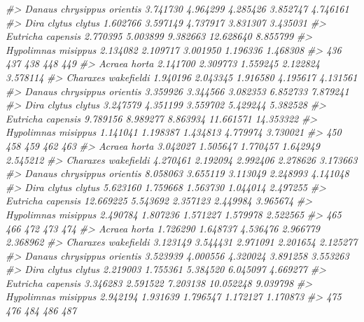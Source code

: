 \documentclass[
]{article}
\newenvironment{Shaded}{\begin{snugshade}}{\end{snugshade}}
\newcommand{\CommentTok}[1]{\textcolor[rgb]{0.56,0.35,0.01}{\textit{#1}}}
\begin{document}
\begin{Shaded}
\begin{Highlighting}[]
\CommentTok{\#\textgreater{} Danaus chrysippus orientis 3.741730 4.964299 4.285426  3.852747 4.746161}
\CommentTok{\#\textgreater{} Dira clytus clytus         1.602766 3.597149 4.737917  3.831307 3.435031}
\CommentTok{\#\textgreater{} Eutricha capensis          2.770395 5.003899 9.382663 12.628640 8.855799}
\CommentTok{\#\textgreater{} Hypolimnas misippus        2.134082 2.109717 3.001950  1.196336 1.468308}
\CommentTok{\#\textgreater{}                                 436      437      438       448       449}
\CommentTok{\#\textgreater{} Acraea horta               2.141700 2.309773 1.559245  2.122824  3.578114}
\CommentTok{\#\textgreater{} Charaxes wakefieldi        1.940196 2.043345 1.916580  4.195617  4.131561}
\CommentTok{\#\textgreater{} Danaus chrysippus orientis 3.359926 3.344566 3.082353  6.852733  7.879241}
\CommentTok{\#\textgreater{} Dira clytus clytus         3.247579 4.351199 3.559702  5.429244  5.382528}
\CommentTok{\#\textgreater{} Eutricha capensis          9.789156 8.989277 8.863934 11.661571 14.353322}
\CommentTok{\#\textgreater{} Hypolimnas misippus        1.141041 1.198387 1.434813  4.779974  3.730021}
\CommentTok{\#\textgreater{}                                  450      458      459      462      463}
\CommentTok{\#\textgreater{} Acraea horta                3.042027 1.505647 1.770457 1.642949 2.545212}
\CommentTok{\#\textgreater{} Charaxes wakefieldi         4.270461 2.192094 2.992406 2.278626 3.173663}
\CommentTok{\#\textgreater{} Danaus chrysippus orientis  8.058063 3.655119 3.113049 2.248993 4.141048}
\CommentTok{\#\textgreater{} Dira clytus clytus          5.623160 1.759668 1.563730 1.044014 2.497255}
\CommentTok{\#\textgreater{} Eutricha capensis          12.669225 5.543692 2.357123 2.449984 3.965674}
\CommentTok{\#\textgreater{} Hypolimnas misippus         2.490784 1.807236 1.571227 1.579978 2.522565}
\CommentTok{\#\textgreater{}                                 465      466      472       473      474}
\CommentTok{\#\textgreater{} Acraea horta               1.726290 1.648737 4.536476  2.966779 2.368962}
\CommentTok{\#\textgreater{} Charaxes wakefieldi        3.123149 3.544431 2.971091  2.201654 2.125277}
\CommentTok{\#\textgreater{} Danaus chrysippus orientis 3.523939 4.000556 4.320024  3.891258 3.553263}
\CommentTok{\#\textgreater{} Dira clytus clytus         2.219003 1.755361 5.384520  6.045097 4.669277}
\CommentTok{\#\textgreater{} Eutricha capensis          3.346283 2.591522 7.203138 10.052248 9.039798}
\CommentTok{\#\textgreater{} Hypolimnas misippus        2.942194 1.931639 1.796547  1.172127 1.170873}
\CommentTok{\#\textgreater{}                                 475      476      484       486       487}

\end{Highlighting}
\end{Shaded}
\end{document}
